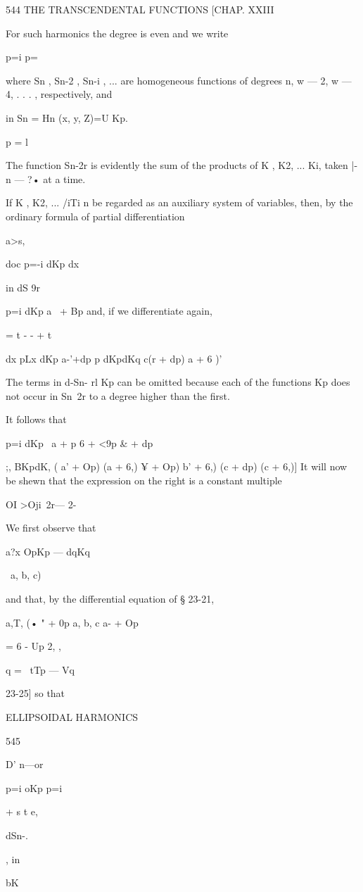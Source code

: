 {544 THE TRANSCENDENTAL FUNCTIONS [CHAP. XXIII

For such harmonics the degree is even and we write

p=i p=\

where Sn , Sn-2 , Sn-i , ... are homogeneous functions of degrees n, w
— 2, w — 4, . . . , respectively, and

in Sn = Hn (x, y, Z)=U Kp.

p = l

The function Sn-2r is evidently the sum of the products of K , K2, ...
Ki, taken |- n — ?• at a time.

If K , K2, ... /iTi n be regarded as an auxiliary system of variables,
then, by the ordinary formula of partial differentiation

a>s,

doc p=-i dKp dx

in dS 9r

p=i dKp a~ + Bp and, if we differentiate again,

= t - - + t

dx pLx dKp a-'+dp p dKpdKq c(r + dp) a + 6 )'

The terms in d-Sn- rl Kp can be omitted because each of the functions
Kp does not occur in Sn\ 2r to a degree higher than the first.

It follows that

p=i dKp \ a + p 6 + <9p \& + dp\

;, BKpdK, ( a' + Op) (a + 6,) ¥ + Op) b' + 6,) (c + dp) (c + 6,)] It
will now be shewn that the expression on the right is a constant
multiple

OI >Oji\ 2r— 2-

We first observe that

a?x OpKp — dqKq

\ a, b, c)

and that, by the differential equation of § 23-21,

a,T, (• " + 0p a, b, c a- + Op

= 6 - Up 2, ,

q = \ tTp — Vq

23-25] so that

ELLIPSOIDAL HARMONICS

545

D' n—or

p=i oKp p=i

+ s t e,

dSn-.

, in

bK

}
